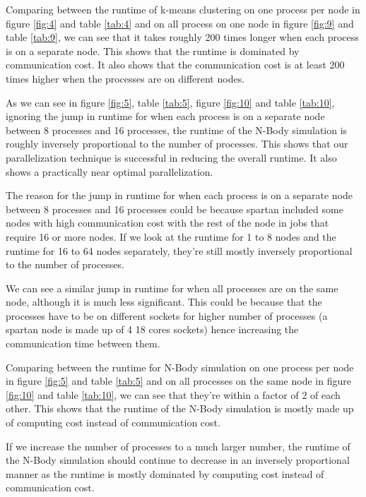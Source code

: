 \documentclass{article}
\begin{document}
Comparing between the runtime of k-means clustering on one process per node in figure \ref{fig:4}
and table \ref{tab:4} and on all process on one node in figure \ref{fig:9} and table \ref{tab:9}, we
can see that it takes roughly 200 times longer when each process is on a separate node. This shows
that the runtime is dominated by communication cost. It also shows that the communication cost is at
least 200 times higher when the processes are on different nodes.

As we can see in figure \ref{fig:5}, table \ref{tab:5}, figure \ref{fig:10} and table \ref{tab:10},
ignoring the jump in runtime for when each process is on a separate node between 8 processes and 16
processes, the runtime of the N-Body simulation is roughly inversely proportional to the number of
processes. This shows that our parallelization technique is successful in reducing the overall
runtime. It also shows a practically near optimal parallelization.

The reason for the jump in runtime for when each process is on a separate node between 8 processes
and 16 processes could be because spartan included some nodes with high communication cost with the
rest of the node in jobs that require 16 or more nodes. If we look at the runtime for 1 to 8 nodes
and the runtime for 16 to 64 nodes separately, they're still mostly inversely proportional to the
number of processes.

We can see a similar jump in runtime for when all processes are on the same node, although it is
much less significant. This could be because that the processes have to be on different sockets for
higher number of processes (a spartan node is made up of 4 18 cores sockets) hence increasing the
communication time between them.

Comparing between the runtime for N-Body simulation on one process per node in figure \ref{fig:5}
and table \ref{tab:5} and on all processes on the same node in figure \ref{fig:10} and table
\ref{tab:10}, we can see that they're within a factor of 2 of each other. This shows that the
runtime of the N-Body simulation is mostly made up of computing cost instead of communication cost.

If we increase the number of processes to a much larger number, the runtime of the N-Body simulation
should continue to decrease in an inversely proportional manner as the runtime is mostly dominated
by computing cost instead of communication cost.

\printbibliography
\end{document}
